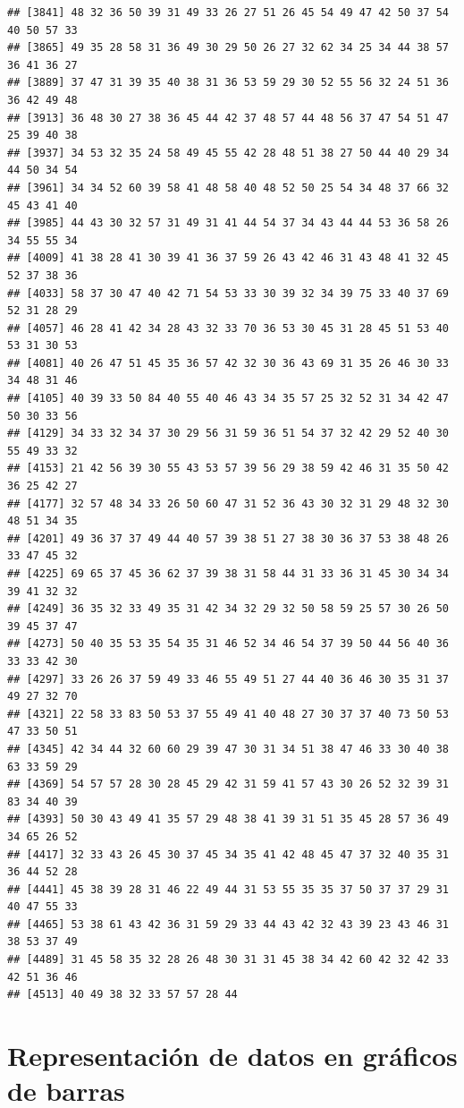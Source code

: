 \documentclass[
]{book}
\begin{document}
\begin{verbatim}
## [3841] 48 32 36 50 39 31 49 33 26 27 51 26 45 54 49 47 42 50 37 54 40 50 57 33
## [3865] 49 35 28 58 31 36 49 30 29 50 26 27 32 62 34 25 34 44 38 57 36 41 36 27
## [3889] 37 47 31 39 35 40 38 31 36 53 59 29 30 52 55 56 32 24 51 36 36 42 49 48
## [3913] 36 48 30 27 38 36 45 44 42 37 48 57 44 48 56 37 47 54 51 47 25 39 40 38
## [3937] 34 53 32 35 24 58 49 45 55 42 28 48 51 38 27 50 44 40 29 34 44 50 34 54
## [3961] 34 34 52 60 39 58 41 48 58 40 48 52 50 25 54 34 48 37 66 32 45 43 41 40
## [3985] 44 43 30 32 57 31 49 31 41 44 54 37 34 43 44 44 53 36 58 26 34 55 55 34
## [4009] 41 38 28 41 30 39 41 36 37 59 26 43 42 46 31 43 48 41 32 45 52 37 38 36
## [4033] 58 37 30 47 40 42 71 54 53 33 30 39 32 34 39 75 33 40 37 69 52 31 28 29
## [4057] 46 28 41 42 34 28 43 32 33 70 36 53 30 45 31 28 45 51 53 40 53 31 30 53
## [4081] 40 26 47 51 45 35 36 57 42 32 30 36 43 69 31 35 26 46 30 33 34 48 31 46
## [4105] 40 39 33 50 84 40 55 40 46 43 34 35 57 25 32 52 31 34 42 47 50 30 33 56
## [4129] 34 33 32 34 37 30 29 56 31 59 36 51 54 37 32 42 29 52 40 30 55 49 33 32
## [4153] 21 42 56 39 30 55 43 53 57 39 56 29 38 59 42 46 31 35 50 42 36 25 42 27
## [4177] 32 57 48 34 33 26 50 60 47 31 52 36 43 30 32 31 29 48 32 30 48 51 34 35
## [4201] 49 36 37 37 49 44 40 57 39 38 51 27 38 30 36 37 53 38 48 26 33 47 45 32
## [4225] 69 65 37 45 36 62 37 39 38 31 58 44 31 33 36 31 45 30 34 34 39 41 32 32
## [4249] 36 35 32 33 49 35 31 42 34 32 29 32 50 58 59 25 57 30 26 50 39 45 37 47
## [4273] 50 40 35 53 35 54 35 31 46 52 34 46 54 37 39 50 44 56 40 36 33 33 42 30
## [4297] 33 26 26 37 59 49 33 46 55 49 51 27 44 40 36 46 30 35 31 37 49 27 32 70
## [4321] 22 58 33 83 50 53 37 55 49 41 40 48 27 30 37 37 40 73 50 53 47 33 50 51
## [4345] 42 34 44 32 60 60 29 39 47 30 31 34 51 38 47 46 33 30 40 38 63 33 59 29
## [4369] 54 57 57 28 30 28 45 29 42 31 59 41 57 43 30 26 52 32 39 31 83 34 40 39
## [4393] 50 30 43 49 41 35 57 29 48 38 41 39 31 51 35 45 28 57 36 49 34 65 26 52
## [4417] 32 33 43 26 45 30 37 45 34 35 41 42 48 45 47 37 32 40 35 31 36 44 52 28
## [4441] 45 38 39 28 31 46 22 49 44 31 53 55 35 35 37 50 37 37 29 31 40 47 55 33
## [4465] 53 38 61 43 42 36 31 59 29 33 44 43 42 32 43 39 23 43 46 31 38 53 37 49
## [4489] 31 45 58 35 32 28 26 48 30 31 31 45 38 34 42 60 42 32 42 33 42 51 36 46
## [4513] 40 49 38 32 33 57 57 28 44
\end{verbatim}

\chapter{Representación de datos en gráficos de barras}\label{representacion_datos_barras}
\end{document}

